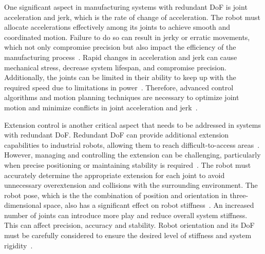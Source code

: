 






One significant aspect in manufacturing systems with redundant DoF is joint acceleration and jerk, which is the rate of change of acceleration. The robot must allocate accelerations effectively among its joints to achieve smooth and coordinated motion. Failure to do so can result in jerky or erratic movements, which not only compromise precision but also impact the efficiency of the manufacturing process~\cite{Duong.2021}. Rapid changes in acceleration and jerk can cause mechanical stress, decrease system lifespan, and compromise precision. Additionally, the joints can be limited in their ability to keep up with the required speed due to limitations in power~\cite{Staff.1988}. Therefore, advanced control algorithms and motion planning techniques are necessary to optimize joint motion and minimize conflicts in joint acceleration and jerk~\cite{Duong.2021, Valente.2017}.

Extension control is another critical aspect that needs to be addressed in systems with redundant DoF. Redundant DoF can provide additional extension capabilities to industrial robots, allowing them to reach difficult-to-access areas~\cite{Duong.2021}. However, managing and controlling the extension can be challenging, particularly when precise positioning or maintaining stability is required~\cite{Lin.2022}.
The robot must accurately determine the appropriate extension for each joint to avoid unnecessary overextension and collisions with the surrounding environment. The robot pose, which is the the combination of position and orientation in three-dimensional space, also has a significant effect on robot stiffness~\cite{Xiong.2019}. An increased number of joints can introduce more play and reduce overall system stiffness. This can affect precision, accuracy and stability. Robot orientation and its DoF must be carefully considered to ensure the desired level of stiffness and system rigidity~\cite{Liu.2022, Shi.2021}.


